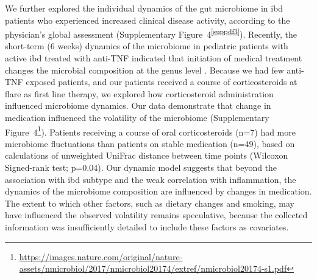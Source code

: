 We further explored the individual dynamics of the gut microbiome in \gls{ibd} patients who experienced increased clinical disease activity, according to the physician's global assessment (Supplementary Figure~4\textsuperscript{\ref{suppdf3}}). Recently, the short-term (6 weeks) dynamics of the microbiome in pediatric patients with active \gls{ibd} treated with anti-TNF indicated that initiation of medical treatment changes the microbial composition at the genus level \cite{Kolho2015}. Because we had few anti-TNF exposed patients, and our patients received a course of corticosteroids at flare as first line therapy, we explored how corticosteroid administration influenced microbiome dynamics. Our data demonstrate that change in medication influenced the volatility of the microbiome (Supplementary Figure~4\footnote{\url{https://images.nature.com/original/nature-assets/nmicrobiol/2017/nmicrobiol20174/extref/nmicrobiol20174-s1.pdf}}). Patients receiving a course of oral corticosteroids (n=7) had more microbiome fluctuations than patients on stable medication (n=49), based on calculations of unweighted UniFrac distance between time points (Wilcoxon Signed-rank test; p=0.04). Our dynamic model suggests that beyond the association with \gls{ibd} subtype and the weak correlation with inflammation, the dynamics of the microbiome composition are influenced by changes in medication. The extent to which other factors, such as dietary changes and smoking, may have influenced the observed volatility remains speculative, because the collected information was insufficiently detailed to include these factors as covariates.

